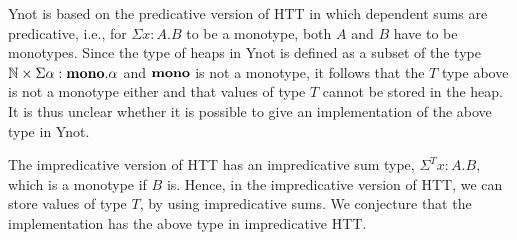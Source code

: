 Ynot is based on the predicative version of HTT\cite{nanevski06separation} in
which dependent sums are predicative, i.e., for $\Sigma x : A. B$ to be a
monotype, both $A$ and $B$ have to be monotypes. Since the type of heaps in Ynot is defined as a subset of the type $\mathbb{N} \times \Sigma \alpha : \mathbf{mono}.
\alpha$ and $\mathbf{mono}$ is not a monotype, it follows that the $T$ type above is not a monotype either and that values of type $T$ cannot be stored in
the heap. It is thus unclear whether it is possible to give an implementation
of the above type in Ynot.

The impredicative version of HTT \cite{petersen08} has an impredicative sum
type, $\Sigma^T x : A. B$, which is a monotype if $B$ is. Hence, in the
impredicative version of HTT, we can store values of type $T$, by using
impredicative sums. We conjecture that the implementation has the above 
type in impredicative HTT.




